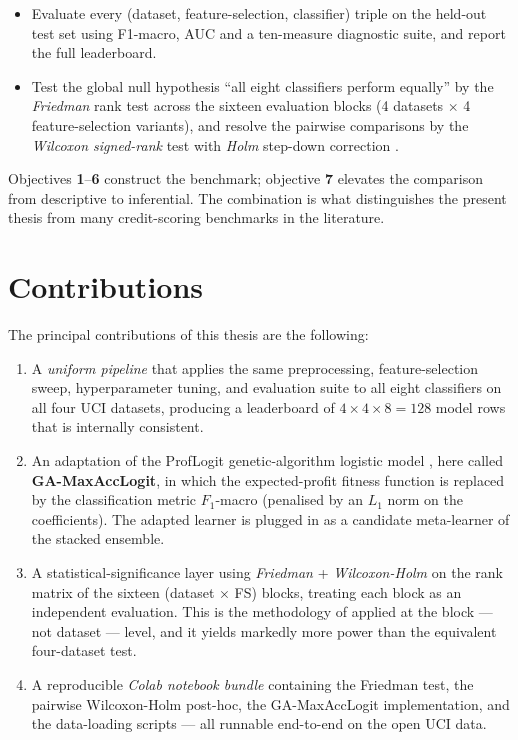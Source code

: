 \begin{itemize}
 \item[\textbf{6.}] Evaluate every (dataset, feature-selection,
 classifier) triple on the held-out test set using F1-macro, AUC and
 a ten-measure diagnostic suite, and report the
 full leaderboard.
 \item[\textbf{7.}] Test the global null hypothesis ``all eight
 classifiers perform equally'' by the \emph{Friedman} rank test
 \citep{friedman1937use} across the sixteen evaluation blocks
 (4 datasets $\times$ 4 feature-selection variants), and resolve
 the pairwise comparisons by the \emph{Wilcoxon signed-rank} test
 with \emph{Holm} step-down correction \citep{demvsar2006statistical}.
\end{itemize}

Objectives \textbf{1}--\textbf{6} construct the benchmark;
objective \textbf{7} elevates the comparison from descriptive to
inferential. The combination is what distinguishes the present
thesis from many credit-scoring benchmarks in the literature.

\section{Contributions}
\label{sec:contributions}

The principal contributions of this thesis are the following:

\begin{enumerate}
 \item A \emph{uniform pipeline} that applies the same preprocessing,
 feature-selection sweep, hyperparameter tuning, and evaluation
 suite to all eight classifiers on all four UCI datasets, producing
 a leaderboard of $4\times4\times8=128$ model rows that is
 internally consistent.
 \item An adaptation of the ProfLogit genetic-algorithm logistic
 model \citep{stripling2018proflogit}, here called
 \textbf{GA-MaxAccLogit}, in which the expected-profit fitness
 function is replaced by the classification metric $F_1$-macro
 (penalised by an $L_1$ norm on the coefficients). The adapted
 learner is plugged in as a candidate meta-learner of the stacked
 ensemble.
 \item A statistical-significance layer using \emph{Friedman} +
 \emph{Wilcoxon-Holm} on the rank matrix of the sixteen
 (dataset $\times$ FS) blocks, treating each block as an
 independent evaluation. This is the methodology of
 \citet{demvsar2006statistical} applied at the
 block --- not dataset --- level, and it yields markedly more
 power than the equivalent four-dataset test.
 \item A reproducible \emph{Colab notebook bundle} containing the
 Friedman test, the pairwise Wilcoxon-Holm post-hoc, the
 GA-MaxAccLogit implementation, and the data-loading scripts
 --- all runnable end-to-end on the open UCI data.
\end{enumerate}

